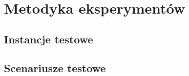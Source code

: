 \chapter{Metodyka eksperymentów}
\label{cha:metodyka}

\section{Instancje testowe}
\label{sec:instancje}

\section{Scenariusze testowe}
\label{sec:scenariusze}